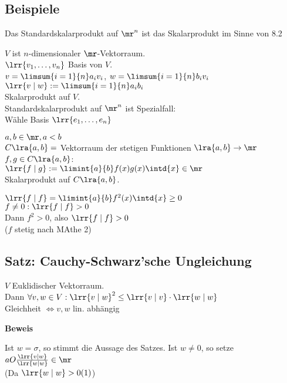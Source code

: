 \subsection{Beispiele}
		\item Das Standardskalarprodukt auf $\mr^n$ ist das Skalarprodukt im Sinne von 8.2
		\item $V$ ist $n$-dimensionaler $\mr$-Vektorraum.\\
			$\lrr{v_1,\dots,v_n}$ Basis von $V$.\\
			$v=\limsum{i=1}{n}a_iv_i$, $w=\limsum{i=1}{n}b_iv_i$\\
			$\lrr{v\mid w}:=\limsum{i=1}{n}a_ib_i$\\
			Skalarprodukt auf $V$.\\
			Standardskalarprodukt auf $\mr^n$ ist Spezialfall:\\
			Wähle Basis $\lrr{e_1,\dots,e_n}$
		\item $a,b\in\mr, a<b$\\
			$C\lra{a,b}=$ Vektorraum der stetigen Funktionen $\lra{a,b}\rightarrow\mr$\\
			$f,g\in C\lra{a,b}$:\\
			$\lrr{f\mid g}:=\limint{a}{b}f(x)g(x)\intd{x}\in\mr$\\
			Skalarprodukt auf $C\lra{a,b}$.\\
				\item $\lrr{f\mid f}=\limint{a}{b}f^2(x)\intd{x}\geq 0$\\
					$f\neq 0: \lrr{f\mid f}>0$\\
					Dann $f^2>0$, also $\lrr{f\mid f}> 0$\\
					($f$ stetig nach MAthe 2)
			\subExEnd
	\subExEnd

\subsection{Satz: Cauchy-Schwarz'sche Ungleichung}
	$V$ Euklidischer Vektorraum.\\
	Dann $\forall v,w\in V: \lrr{v\mid w}^2\leq\lrr{v\mid v}\cdot\lrr{w\mid w}$\\
	Gleichheit $\Leftrightarrow v,w$ lin. abhängig

	\textbf{Beweis}

	Ist $w=\sigma$, so stimmt die Aussage des Satzes. Ist $w\neq 0$, so setze $aO\frac{\lrr{v\mid w}}{\lrr{w\mid w}}\in\mr$\\
	(Da $\lrr{w\mid w}> 0 (1)$)

